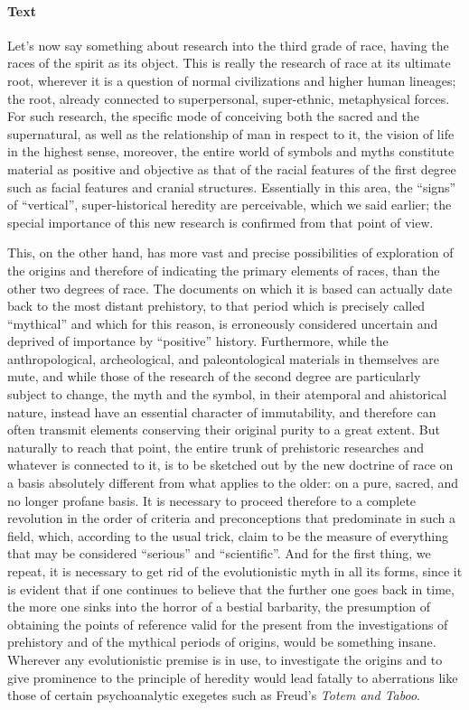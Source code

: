 \paragraph{Text}


Let's now say something about research into the third grade of race, having the races of the spirit as its object. This is really the research of race at its ultimate root, wherever it is a question of normal civilizations and higher human lineages; the root, already connected to superpersonal, super-ethnic, metaphysical forces. For such research, the specific mode of conceiving both the sacred and the supernatural, as well as the relationship of man in respect to it, the vision of life in the highest sense, moreover, the entire world of symbols and myths constitute material as positive and objective as that of the racial features of the first degree such as facial features and cranial structures. Essentially in this area, the ``signs'' of ``vertical'', super-historical heredity are perceivable, which we said earlier; the special importance of this new research is confirmed from that point of view.

This, on the other hand, has more vast and precise possibilities of exploration of the origins and therefore of indicating the primary elements of races, than the other two degrees of race. The documents on which it is based can actually date back to the most distant prehistory, to that period which is precisely called ``mythical'' and which for this reason, is erroneously considered uncertain and deprived of importance by ``positive'' history. Furthermore, while the anthropological, archeological, and paleontological materials in themselves are mute, and while those of the research of the second degree are particularly subject to change, the myth and the symbol, in their atemporal and ahistorical nature, instead have an essential character of immutability, and therefore can often transmit elements conserving their original purity to a great extent. But naturally to reach that point, the entire trunk of prehistoric researches and whatever is connected to it, is to be sketched out by the new doctrine of race on a basis absolutely different from what applies to the older: on a pure, sacred, and no longer profane basis. It is necessary to proceed therefore to a complete revolution in the order of criteria and preconceptions that predominate in such a field, which, according to the usual trick, claim to be the measure of everything that may be considered ``serious'' and ``scientific''. And for the first thing, we repeat, it is necessary to get rid of the evolutionistic myth in all its forms, since it is evident that if one continues to believe that the further one goes back in time, the more one sinks into the horror of a bestial barbarity, the presumption of obtaining the points of reference valid for the present from the investigations of prehistory and of the mythical periods of origins, would be something insane. Wherever any evolutionistic premise is in use, to investigate the origins and to give prominence to the principle of heredity would lead fatally to aberrations like those of certain psychoanalytic exegetes such as Freud's \emph{Totem and Taboo}.


